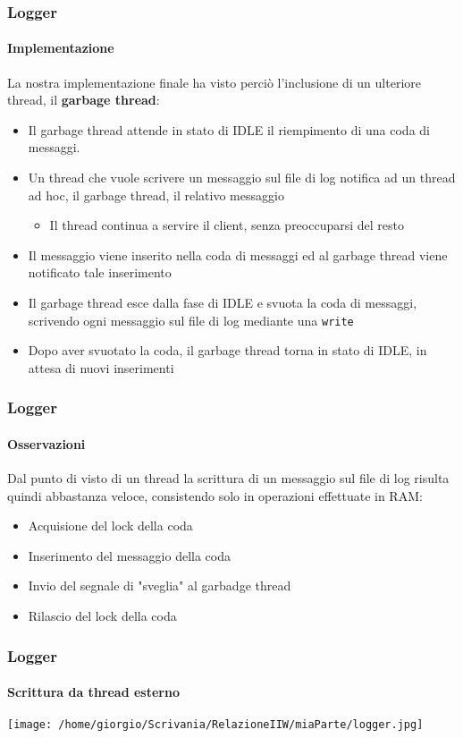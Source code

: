 \documentclass{beamer}
\begin{document}
\begin{frame}
\frametitle{Logger}
\framesubtitle{Implementazione}
La nostra implementazione finale ha visto perciò l’inclusione di un ulteriore
thread, il \textbf{garbage thread}:
\begin{itemize}
\item Il garbage thread attende in stato di IDLE il riempimento di una coda di
messaggi.
\item Un thread che vuole scrivere un messaggio sul file di log notifica ad un thread
ad hoc, il garbage thread, il relativo messaggio
\begin{itemize}
\item Il thread continua a servire il client, senza preoccuparsi del resto
\end{itemize}
\item Il messaggio viene inserito nella coda di messaggi ed al garbage thread viene
notificato tale inserimento
\item Il garbage thread esce dalla fase di IDLE e svuota la coda di messaggi,
scrivendo ogni messaggio sul file di log mediante una \texttt{write}
\item Dopo aver svuotato la coda, il garbage thread torna in stato di IDLE, in attesa di
nuovi inserimenti

\end{itemize}

\end{frame}
\begin{frame}
\frametitle{Logger}
\framesubtitle{Osservazioni}
Dal punto di visto di un thread la scrittura di un messaggio sul file di log risulta
quindi abbastanza veloce, consistendo solo in operazioni effettuate in RAM:
\begin{itemize}
\item Acquisione del lock della coda
\item Inserimento del messaggio della coda
\item Invio del segnale di "sveglia" al garbadge thread
\item Rilascio del lock della coda
\end{itemize}
\end{frame}

\begin{frame}
\frametitle{Logger}
\framesubtitle{Scrittura da thread esterno}

\begin{center}
\texttt{[image: /home/giorgio/Scrivania/RelazioneIIW/miaParte/logger.jpg]}
\end{center}



\end{frame}
\end{document}
